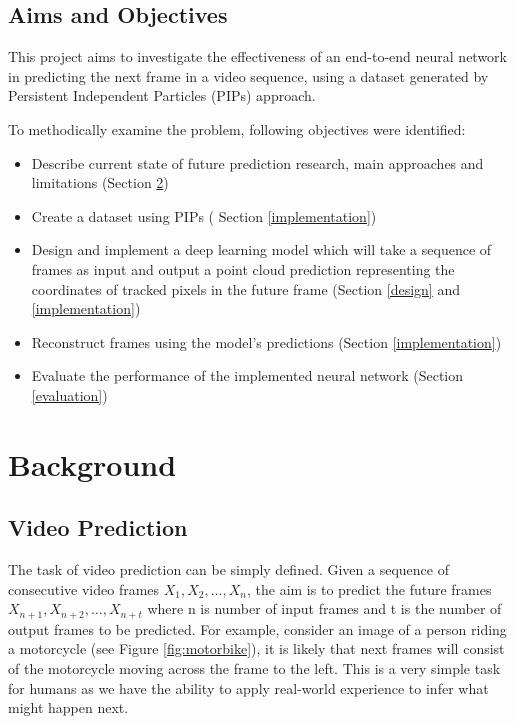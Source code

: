 \documentclass{l4proj}
\begin{document}
\section{Aims and Objectives}
This project aims to investigate the effectiveness of an end-to-end neural network in predicting the next frame in a video sequence, using a dataset generated by Persistent Independent Particles (PIPs) approach. 

To methodically examine the problem, following objectives were identified:
\begin{itemize}
    \item Describe current state of future prediction research, main approaches and limitations (Section \ref{backgound})
    \item Create a dataset using PIPs ( Section \ref{implementation})
    \item Design and implement a deep learning model which will take a sequence of frames as input and output a point cloud prediction representing the coordinates of tracked pixels in the future frame (Section \ref{design} and \ref{implementation}) 
    \item Reconstruct frames using the model’s predictions (Section \ref{implementation})
    \item Evaluate the performance of the implemented neural network (Section \ref{evaluation})
\end{itemize}

\chapter{Background} \label{backgound}
\section{Video Prediction}

The task of video prediction can be simply defined. Given a sequence of consecutive video frames $X_1, X_2, \dots, X_n$, the aim is to predict the future frames $X_{n+1}, X_{n+2}, \dots, X_{n+t}$ where n is number of input frames and t is the number of output frames to be predicted. For example, consider an image of a person riding a motorcycle (see Figure \ref{fig:motorbike}), it is likely that next frames will consist of the motorcycle moving across the frame to the left. This is a very simple task for humans as we have the ability to apply real-world experience to infer what might happen next.
\end{document}
